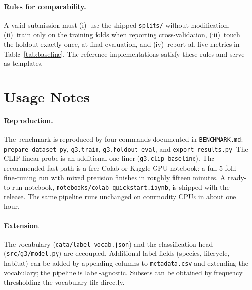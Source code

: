 \documentclass[11pt,a4paper]{article}
\begin{document}
\paragraph{Rules for comparability.} A valid submission must
(i)~use the shipped \texttt{splits/} without modification,
(ii)~train only on the training folds when reporting
cross-validation, (iii)~touch the holdout exactly once, at final
evaluation, and (iv)~report all five metrics in
Table~\ref{tab:baseline}. The reference implementations satisfy
these rules and serve as templates.

\section{Usage Notes}

\paragraph{Reproduction.} The benchmark is reproduced by four
commands documented in \texttt{BENCHMARK.md}:
\texttt{prepare\_dataset.py}, \texttt{g3.train},
\texttt{g3.holdout\_eval}, and \texttt{export\_results.py}. The CLIP
linear probe is an additional one-liner
(\texttt{g3.clip\_baseline}). The recommended fast path is a free
Colab or Kaggle GPU notebook: a full 5-fold fine-tuning run with
mixed precision finishes in roughly fifteen minutes. A ready-to-run
notebook, \texttt{notebooks/colab\_quickstart.ipynb}, is shipped
with the release. The same pipeline runs unchanged on commodity
CPUs in about one hour.

\paragraph{Extension.} The vocabulary
(\texttt{data/label\_vocab.json}) and the classification head
(\texttt{src/g3/model.py}) are decoupled. Additional label fields
(species, lifecycle, habitat) can be added by appending columns to
\texttt{metadata.csv} and extending the vocabulary; the pipeline is
label-agnostic. Subsets can be obtained by frequency thresholding
the vocabulary file directly.
\end{document}
